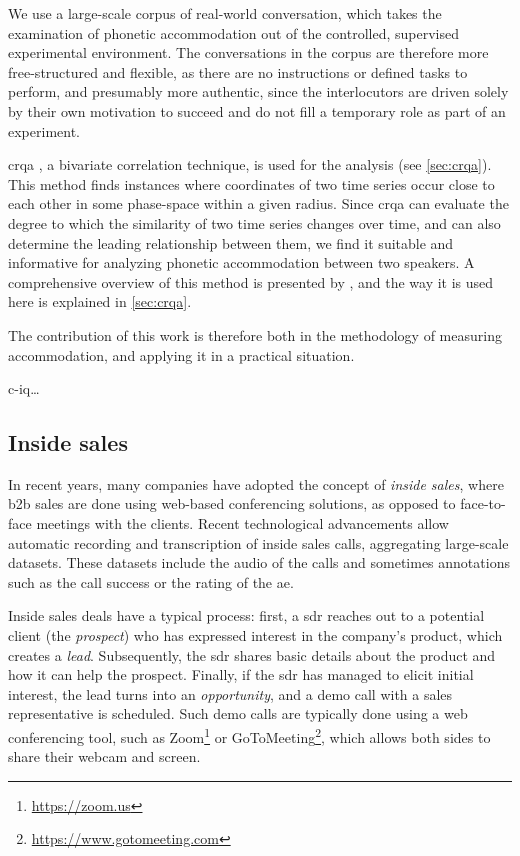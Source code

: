 We use a large-scale corpus of real-world conversation, which takes the examination of phonetic accommodation out of the controlled, supervised experimental environment.
The conversations in the corpus are therefore more free-structured and flexible, as there are no instructions or defined tasks to perform, and presumably more authentic, since the interlocutors are driven solely by their own motivation to succeed and do not fill a temporary role as part of an experiment.

\Ac{crqa} \citep{Zbilut1998detecting}, a bivariate correlation technique, is used for the analysis (see \cref{sec:crqa}).
This method finds instances where coordinates of two time series occur close to each other in some phase-space within a given radius.
Since \ac{crqa} can evaluate the degree to which the similarity of two time series changes over time, and can also determine the leading relationship between them, we find it suitable and informative for analyzing phonetic accommodation between two speakers.
A comprehensive overview of this method is presented by \citet{Wallot2018analyzing}, and the way it is used here is explained in \cref{sec:crqa}.

The contribution of this work is therefore both in the methodology of measuring accommodation, and applying it in a practical situation.

\Acf{c-iq}\ldots

\subsection{Inside sales}
\label{subsec:inside_sales}

In recent years, many companies have adopted the concept of \emph{inside sales}, where \ac{b2b} sales are done using web-based conferencing solutions, as opposed to face-to-face meetings with the clients.
Recent technological advancements allow automatic recording and transcription of inside sales calls, aggregating large-scale datasets.
These datasets include the audio of the calls and sometimes annotations such as the call success or the rating of the \ac{ae}.

Inside sales deals have a typical process:
first, a \ac{sdr} reaches out to a potential client (the \emph{prospect}) who has expressed interest in the company's product, which creates a \emph{lead}.
Subsequently, the \ac{sdr} shares basic details about the product and how it can help the prospect.
Finally, if the \ac{sdr} has managed to elicit initial interest, the lead turns into an \emph{opportunity}, and a demo call with a sales representative is scheduled.
Such demo calls are typically done using a web conferencing tool, such as Zoom\footnote{\url{https://zoom.us}} or GoToMeeting\footnote{\url{https://www.gotomeeting.com}}, which allows both sides to share their webcam and screen.

